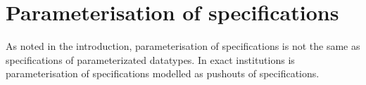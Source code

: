 




\section{Parameterisation of specifications}
\label{se:paraspec}
As noted in the introduction, parameterisation of specifications is not the same as specifications of parameterizated datatypes.
In exact institutions is parameterisation of specifications modelled as pushouts of specifications.








